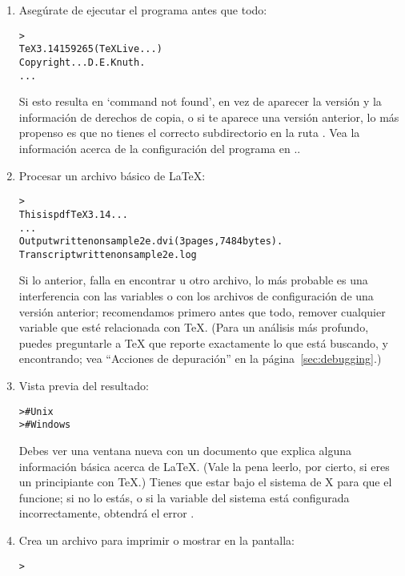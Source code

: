 \documentclass{article}
\begin{document}
\begin{enumerate}
	\item Asegúrate de ejecutar el programa  antes
		que todo:
	\begin{alltt}
		> 
		TeX 3.14159265 (TeX Live ...)
		Copyright ... D.E. Knuth.
		...
	\end{alltt}
Si esto resulta en `command not found', en vez de aparecer la versión y la
información de derechos de copia, o si te aparece una versión
anterior, lo más propenso es que no tienes el correcto subdirectorio
 en la ruta . Vea la información acerca de
la configuración del programa en \p.\pageref{sec:env}. 

\item Procesar un archivo básico de \LaTeX{}:
\begin{alltt}
	> 
	This is pdfTeX 3.14 ...
	...
	Output written on sample2e.dvi (3 pages, 7484 bytes).
	Transcript written on sample2e.log
\end{alltt}

Si lo anterior, falla en encontrar  u otro
archivo, lo más probable es una interferencia con las variables o con los
archivos de configuración de una versión anterior; recomendamos primero antes que todo, remover cualquier variable que esté relacionada con \TeX.
(Para un análisis más profundo, puedes preguntarle a \TeX{} que
reporte exactamente lo que está buscando, y encontrando; vea
``Acciones de depuración'' en la página~\ref{sec:debugging}.)

\item Vista previa del resultado:
\begin{alltt}
>     # Unix
>   # Windows
\end{alltt}
Debes ver una ventana nueva con un documento que explica alguna
información básica acerca de \LaTeX{}. (Vale la pena leerlo, por
cierto, si eres un principiante con \TeX.) Tienes que estar bajo el
sistema de X para que el  funcione; si no lo estás, o 
si la variable del sistema  está configurada
incorrectamente, obtendrá el error .

\item Crea un archivo \PS{} para imprimir o mostrar en la pantalla:
\begin{alltt}
> 
\end{alltt}


\end{enumerate}
\end{document}
